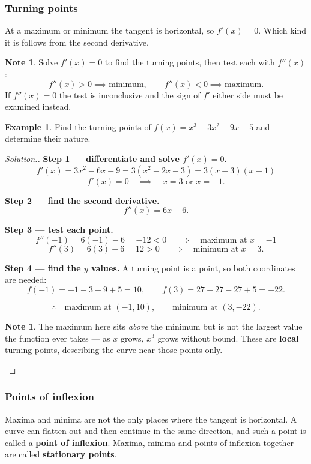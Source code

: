 \documentclass[11pt,a4paper]{article}
\theoremstyle{definition}
\newtheorem{example}[thm]{Example}
\newtheorem{note}[thm]{Note}
\newenvironment{solution}
  {\renewcommand{\qedsymbol}{}\begin{proof}[\textit{Solution}.]}
  {\end{proof}}
\begin{document}
\subsubsection{Turning points}

At a maximum or minimum the tangent is horizontal, so $f'(x)=0$. Which kind it is
follows from the second derivative.

\begin{note}
Solve $f'(x)=0$ to find the turning points, then test each with $f''(x)$:
$$f''(x)>0 \implies \text{minimum},\qquad f''(x)<0 \implies \text{maximum}.$$
If $f''(x)=0$ the test is inconclusive and the sign of $f'$ either side must be examined
instead.
\end{note}

\begin{example}
Find the turning points of $f(x)=x^3-3x^2-9x+5$ and determine their nature.
\end{example}

\begin{solution}
\textbf{Step 1 --- differentiate and solve $f'(x)=0$.}
$$f'(x)=3x^2-6x-9=3\left(x^2-2x-3\right)=3(x-3)(x+1)$$
$$f'(x)=0\quad\implies\quad x=3 \text{ or } x=-1.$$

\textbf{Step 2 --- find the second derivative.}
$$f''(x)=6x-6.$$

\textbf{Step 3 --- test each point.}
$$f''(-1)=6(-1)-6=-12<0\quad\implies\quad \text{maximum at } x=-1$$
$$f''(3)=6(3)-6=12>0\quad\implies\quad \text{minimum at } x=3.$$

\textbf{Step 4 --- find the $y$ values.} A turning point is a point, so both
coordinates are needed:
$$f(-1)=-1-3+9+5=10,\qquad f(3)=27-27-27+5=-22.$$

$$\therefore\quad \text{maximum at } (-1,10),\qquad \text{minimum at } (3,-22).$$

\begin{note}
The maximum here sits \emph{above} the minimum but is not the largest value the function
ever takes --- as $x$ grows, $x^3$ grows without bound. These are \textbf{local} turning
points, describing the curve near those points only.
\end{note}
\end{solution}

\subsubsection{Points of inflexion}

Maxima and minima are not the only places where the tangent is horizontal. A curve can
flatten out and then continue in the same direction, and such a point is called a
\textbf{point of inflexion}. Maxima, minima and points of inflexion together are called
\textbf{stationary points}.
\end{document}
